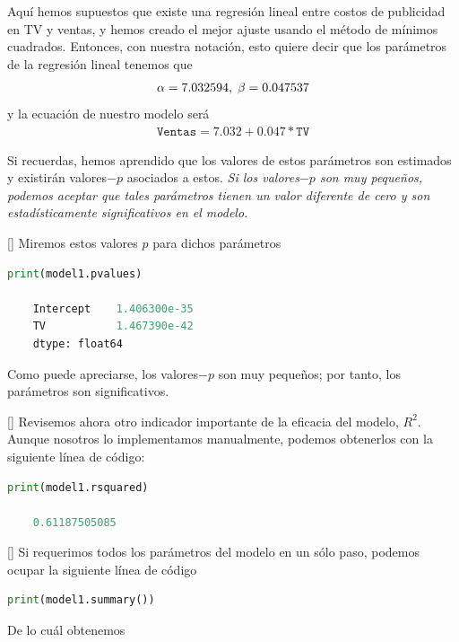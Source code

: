 Aquí hemos supuestos que existe una regresión lineal entre costos de publicidad en TV y ventas, y hemos creado el mejor ajuste usando el método de mínimos cuadrados. Entonces, con nuestra notación, esto quiere decir que los parámetros de la regresión lineal tenemos que
\begin{align}
	\alpha = 7.032594, \; \beta= 0.047537
\end{align}
y la ecuación de nuestro modelo será
\begin{align}
	\texttt{Ventas} = 7.032 + 0.047*\texttt{TV}
\end{align}


Si recuerdas, hemos aprendido que los valores de estos parámetros son estimados y existirán valores$-p$ asociados a estos. \emph{Si los valores$-p$ son muy pequeños, podemos aceptar que tales parámetros tienen un valor diferente de cero y son estadísticamente significativos en el modelo.}

[]
Miremos estos valores $p$ para dichos parámetros
\begin{lstlisting}[language=Python]
	print(model1.pvalues)
	
	Intercept    1.406300e-35
	TV           1.467390e-42
	dtype: float64
\end{lstlisting}

Como puede apreciarse, los valores$-p$ son muy pequeños; por tanto, los parámetros son significativos.

[]{}
Revisemos ahora otro indicador importante de la eficacia del modelo, $R^{2}.$ Aunque nosotros lo implementamos manualmente, podemos obtenerlos con la siguiente línea de código:
\begin{lstlisting}[language=Python]
	print(model1.rsquared)
	
	0.61187505085
\end{lstlisting}


[]{}
Si requerimos todos los parámetros del modelo en un sólo paso, podemos ocupar la siguiente línea de código
\begin{lstlisting}[language=Python]
	print(model1.summary())
\end{lstlisting}
De lo cuál obtenemos

